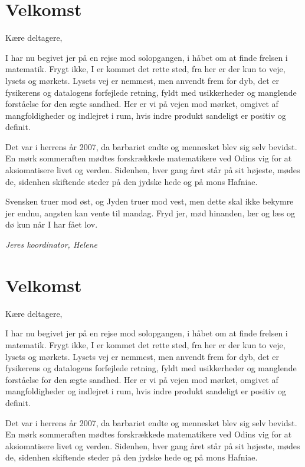 \documentclass[article,10pt,a4,oneside]{memoir}
\begin{document}
\begin{minipage}[b]{0.95\textwidth}
\begin{minipage}[t]{0.47\textwidth}
\vspace{3mm}

\section*{Velkomst}
Kære deltagere,

I har nu begivet jer på en rejse mod solopgangen, i håbet om at finde frelsen i matematik. Frygt ikke, I er kommet det rette sted, fra her er der kun to veje, lysets og mørkets. Lysets vej er nemmest, men anvendt frem for dyb, det er fysikerens og datalogens forfejlede retning, fyldt med usikkerheder og manglende forståelse for den ægte sandhed. Her er vi på vejen mod mørket, omgivet af mangfoldigheder og indlejret i rum, hvis indre produkt sandeligt er positiv og definit.

Det var i herrens år 2007, da barbariet endte og mennesket blev sig selv bevidst. En mørk sommeraften mødtes forskrækkede matematikere ved Odins vig for at aksiomatisere livet og verden. Sidenhen, hver gang året står på sit højeste, mødes de, sidenhen skiftende steder på den jydske hede og på mons Hafniae.

Svensken truer mod øst, og Jyden truer mod vest, men dette skal ikke bekymre jer endnu, angsten kan vente til mandag. Fryd jer, mød hinanden, lær og læs og dø kun når I har fået lov. 

{\flushright\emph{Jeres koordinator, Helene}}

\section*{Velkomst}
Kære deltagere,

I har nu begivet jer på en rejse mod solopgangen, i håbet om at finde frelsen i matematik. Frygt ikke, I er kommet det rette sted, fra her er der kun to veje, lysets og mørkets. Lysets vej er nemmest, men anvendt frem for dyb, det er fysikerens og datalogens forfejlede retning, fyldt med usikkerheder og manglende forståelse for den ægte sandhed. Her er vi på vejen mod mørket, omgivet af mangfoldigheder og indlejret i rum, hvis indre produkt sandeligt er positiv og definit.

Det var i herrens år 2007, da barbariet endte og mennesket blev sig selv bevidst. En mørk sommeraften mødtes forskrækkede matematikere ved Odins vig for at aksiomatisere livet og verden. Sidenhen, hver gang året står på sit højeste, mødes de, sidenhen skiftende steder på den jydske hede og på mons Hafniae.


\end{minipage}
\end{minipage}
\end{document}
